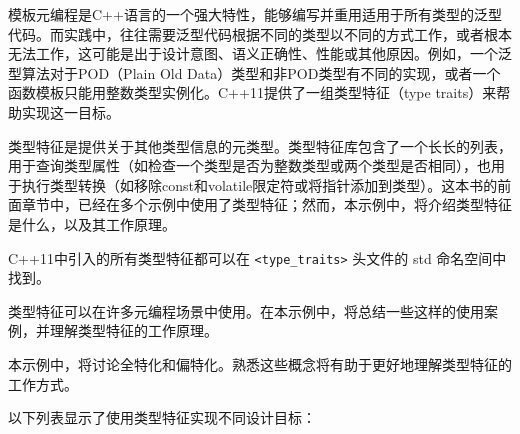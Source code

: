 
模板元编程是C++语言的一个强大特性，能够编写并重用适用于所有类型的泛型代码。而实践中，往往需要泛型代码根据不同的类型以不同的方式工作，或者根本无法工作，这可能是出于设计意图、语义正确性、性能或其他原因。例如，一个泛型算法对于POD（Plain Old Data）类型和非POD类型有不同的实现，或者一个函数模板只能用整数类型实例化。C++11提供了一组类型特征（type traits）来帮助实现这一目标。

类型特征是提供关于其他类型信息的元类型。类型特征库包含了一个长长的列表，用于查询类型属性（如检查一个类型是否为整数类型或两个类型是否相同），也用于执行类型转换（如移除const和volatile限定符或将指针添加到类型）。这本书的前面章节中，已经在多个示例中使用了类型特征；然而，本示例中，将介绍类型特征是什么，以及其工作原理。


C++11中引入的所有类型特征都可以在 \verb|<type_traits>| 头文件的 std 命名空间中找到。

类型特征可以在许多元编程场景中使用。在本示例中，将总结一些这样的使用案例，并理解类型特征的工作原理。

本示例中，将讨论全特化和偏特化。熟悉这些概念将有助于更好地理解类型特征的工作方式。


以下列表显示了使用类型特征实现不同设计目标：

